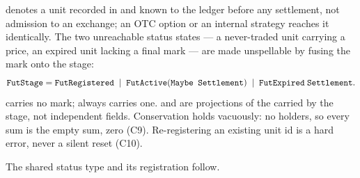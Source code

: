  denotes a unit recorded in and known to the ledger before any settlement, not
admission to an exchange; an OTC option or an internal strategy reaches it identically. The two
unreachable status states --- a never-traded unit carrying a price, an expired unit lacking a final
mark --- are made unspellable by fusing the mark onto the stage:
\[
\texttt{FutStage}=\texttt{FutRegistered}\;\mid\;\texttt{FutActive}(\texttt{Maybe Settlement})\;\mid\;
\texttt{FutExpired}\;\texttt{Settlement}.
\]
 carries no mark;  always carries one. 
and  are projections of the  carried by the stage, not
independent fields. Conservation holds vacuously: no holders, so every sum is the empty sum, zero
(C9). Re-registering an existing unit id is a hard error, never a silent reset (C10).

The shared status type and its registration follow.

